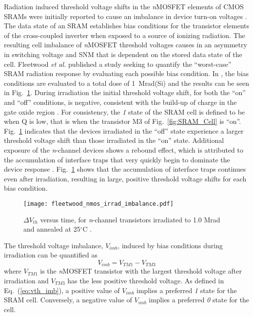 Radiation induced threshold voltage shifts in the \emph{n}MOSFET elements of CMOS SRAMs were initially reported to cause an imbalance in device turn-on voltages \cite{Arimura:1985wl}.
The data state of an SRAM establishes bias conditions for the transistor elements of the cross-coupled inverter when exposed to a source of ionizing radiation. 
The resulting cell imbalance of \emph{n}MOSFET threshold voltages causes in an asymmetry in switching voltage and SNM that is dependent on the stored data state of the cell. 
Fleetwood \emph{et al.} published a study seeking to quantify the ``worst-case'' SRAM radiation response by evaluating each possible bias condition. 
In \cite{Fleetwood:1987cfa}, the bias conditions are evaluated to a total dose of 1~Mrad(Si) and the results can be seen in Fig.~\ref{fig:sram_cell_imb_nmos_vth}.
During irradiation the initial threshold voltage shift, for both the ``on'' and ``off'' conditions, is negative, consistent with the build-up of charge in the gate oxide region \cite{Dressendorfer:1981kg,Galloway:1990kh}. 
For consistency, the \emph{1} state of the SRAM cell is defined to be when Q is low, that is when the transistor M3 of Fig.~\ref{fig:SRAM_Cell} is ``on''.
Fig.~\ref{fig:sram_cell_imb_nmos_vth} indicates that the devices irradiated in the ``off'' state experience a larger threshold voltage shift than those irradiated in the ``on'' state.
Additional exposure of the \emph{n}-channel devices shows a rebound effect, which is attributed to the accumulation of interface traps that very quickly begin to dominate the device response \cite{Fleetwood:1993vs,Galloway:1990kh}. 
Fig.~\ref{fig:sram_cell_imb_nmos_vth} shows that the accumulation of interface traps continues even after irradiation, resulting in large, positive threshold voltage shifts for each bias condition.

\begin{figure}[tb]
    \begin{center}
        \texttt{[image: fleetwood\_nmos\_irrad\_imbalance.pdf]}
    \end{center}
    \caption[$\Delta V_{th}$ versus time, for \emph{n}-channel transistors irradiated to 1.0 Mrad and annealed at 25$^\circ$C.]{$\Delta V_{th}$ versus time, for \emph{n}-channel transistors irradiated to 1.0 Mrad and annealed at 25$^\circ$C \cite{Fleetwood:1987cfa}.}
    \label{fig:sram_cell_imb_nmos_vth}
\end{figure}

The threshold voltage imbalance, $V_{imb}$, induced by bias conditions during irradiation can be quantified as
\begin{equation}
    \label{eq:vth_imb}
    V_{imb} = V_{TM1} - V_{TM3}
\end{equation}
where $V_{TM1}$ is the \emph{n}MOSFET transistor with the largest threshold voltage after irradiation and $V_{TM3}$ has the less positive threshold voltage.
As defined in Eq.~(\ref{eq:vth_imb}), a positive value of $V_{imb}$ implies a preferred \emph{1} state for the SRAM cell.
Conversely, a negative value of $V_{imb}$ implies a preferred \emph{0} state for the cell.

